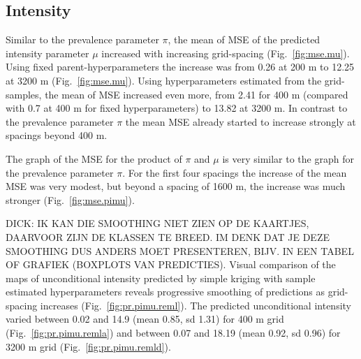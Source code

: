 \documentclass[review]{elsarticle}
\begin{document}
\subsection{Intensity}
Similar to the prevalence parameter $\pi$, the  mean of MSE of the predicted intensity parameter $\mu$ increased with increasing grid-spacing (Fig.~\ref{fig:mse.mu}). Using fixed parent-hyperparameters the increase was from 0.26 at 200 m to 12.25 at 3200 m (Fig.~\ref{fig:mse.mu}). Using hyperparameters estimated from the grid-samples, the mean of MSE increased even more, from 2.41 for 400 m (compared with 0.7 at 400 m for fixed hyperparameters) to 13.82 at 3200 m.  In contrast to the prevalence parameter $\pi$ the mean MSE already started to increase strongly at spacings beyond 400 m.

The  graph of the MSE for the product of $\pi$ and $\mu$ is very similar to the graph for the prevalence parameter $\pi$. For the first four spacings the increase of the mean MSE was very modest, but beyond a spacing of 1600 m, the increase was much stronger (Fig.~\ref{fig:mse.pimu}).

DICK: IK KAN DIE SMOOTHING NIET ZIEN OP DE KAARTJES, DAARVOOR ZIJN DE KLASSEN TE BREED. IM DENK DAT JE DEZE SMOOTHING DUS ANDERS MOET PRESENTEREN, BIJV. IN EEN TABEL OF GRAFIEK (BOXPLOTS VAN PREDICTIES). Visual comparison of the maps of unconditional intensity predicted by simple kriging with sample estimated hyperparameters reveals progressive smoothing of predictions as grid-spacing increases (Fig.~\ref{fig:pr.pimu.reml}). The predicted unconditional intensity varied between 0.02 and 14.9 (mean 0.85, sd 1.31) for 400 m grid (Fig.~\ref{fig:pr.pimu.remla}) and between 0.07 and 18.19 (mean 0.92, sd 0.96) for 3200 m grid (Fig.~\ref{fig:pr.pimu.remld}).
\end{document}
